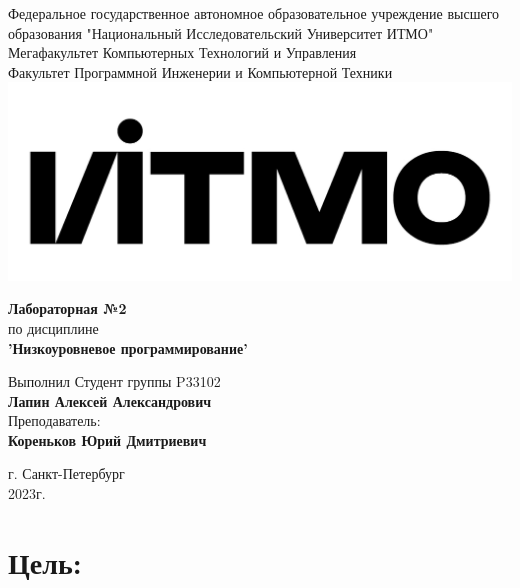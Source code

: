 \documentclass[12pt,onecolumn]{article}
\begin{document}
\setcounter{tocdepth}{4}
\begin{center}
    Федеральное государственное автономное образовательное учреждение высшего образования "Национальный Исследовательский Университет ИТМО"\\ 
    Мегафакультет Компьютерных Технологий и Управления\\
    Факультет Программной Инженерии и Компьютерной Техники \\
    \includegraphics[scale=0.3]{image/itmo.jpg} %
\end{center}
\vspace{1cm}


\begin{center}
    \textbf{Лабораторная №2}\\
    по дисциплине\\
    \textbf{'Низкоуровневое программирование'}
\end{center}

\vspace{2cm}

\begin{flushright}
  Выполнил Студент  группы P33102\\
  \textbf{Лапин Алексей Александрович}\\
  Преподаватель: \\
  \textbf{Кореньков Юрий Дмитриевич}\\
\end{flushright}

\vspace{6cm}
\begin{center}
    г. Санкт-Петербург\\
    2023г.
\end{center}

\newpage
\tableofcontents
\newpage

\section{Цель:}
\end{document}

